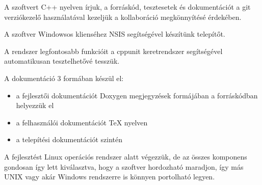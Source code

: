 \documentclass[a4paper,12pt]{article}
\begin{document}
A szoftvert C++ nyelven írjuk, a forráskód, tesztesetek és dokumentációt a git
verziókezelő használatával kezeljük a kollaboráció megkönnyítésé érdekében.

A szoftver Windowsos klienséhez NSIS segítségével készítünk telepítőt.

A rendszer legfontosabb funkcióit a cppunit keretrendszer segítségével
automatikusan tesztelhetővé tesszük.

A dokumentáció 3 formában készül el:
\begin{itemize}
\item a fejlesztői dokumentációt Doxygen megjegyzések formájában a forráskódban
helyezzük el
\item a felhasználói dokumentációt \TeX{} nyelven
\item a telepítési dokumentációt szintén
\end{itemize}

A fejlesztést Linux operációs rendszer alatt végezzük, de az összes komponens
gondosan így lett kiválasztva, hogy a szoftver hordozható maradjon, így más
UNIX vagy akár Windows rendszerre is könnyen portolható legyen.
\end{document}
